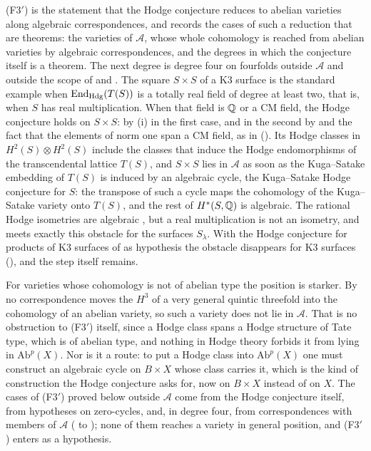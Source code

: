 \begin{remark}\label{rem:f3primeopen}
\textup{(F3$'$)} is the statement that the Hodge conjecture reduces to
abelian varieties along algebraic correspondences, and
 records the cases of such a reduction that are theorems:
the varieties of $\mathcal{A}$, whose whole cohomology is reached from abelian
varieties by algebraic correspondences, and the degrees in which the
conjecture itself is a theorem. The next degree is degree four on fourfolds
outside $\mathcal{A}$ and outside the scope of  and
. The square $S\times S$ of a K3 surface is the standard
example when $\operatorname{End}_{\mathrm{Hdg}}(T(S))$ is a totally real field of degree
at least two, that is, when $S$ has real multiplication. When that field is
$\mathbb{Q}$ or a CM field, the Hodge conjecture holds on $S\times S$: by
(i) in the first case, and in the second by
\cite{Bus19} and the fact that the elements of norm one span a CM field, as in
\cite{RM08} (). Its Hodge classes in
$H^{2}(S)\otimes H^{2}(S)$ include the classes
that induce the Hodge endomorphisms of the transcendental lattice $T(S)$, and
$S\times S$ lies in $\mathcal{A}$ as soon as the Kuga--Satake embedding of
$T(S)$ is induced by an algebraic cycle, the Kuga--Satake Hodge conjecture for
$S$: the transpose of such a cycle maps the
cohomology of the Kuga--Satake variety onto $T(S)$, and the rest of
$H^{*}(S,\mathbb{Q})$ is algebraic. The rational Hodge isometries are algebraic
\cite{Bus19}, but a real multiplication is not an isometry, and
 meets exactly this obstacle for the surfaces
$S_{\lambda}$. With the Hodge conjecture for products of K3 surfaces of
\cite{OAI26f} as hypothesis the obstacle disappears for K3 surfaces
(), and the step itself remains.

For varieties whose cohomology is not of abelian type the position is
starker. By  no correspondence moves the $H^{3}$ of a
very general quintic threefold into the cohomology of an abelian variety, so
such a variety does not lie in $\mathcal{A}$. That is no obstruction to
\textup{(F3$'$)} itself, since a Hodge class spans a Hodge structure of Tate
type, which is of abelian type, and nothing in Hodge theory forbids it from
lying in $\mathrm{Ab}^{p}(X)$. Nor is it a route: to put a Hodge class into
$\mathrm{Ab}^{p}(X)$ one must construct an algebraic cycle on $B\times X$
whose class carries it, which is the kind of construction the Hodge
conjecture asks for, now on $B\times X$ instead of on $X$. The cases of
\textup{(F3$'$)} proved below outside $\mathcal{A}$ come from the Hodge
conjecture itself, from hypotheses on zero-cycles, and, in degree four, from
correspondences with members of $\mathcal{A}$
( to ); none of them reaches a
variety in general position, and \textup{(F3$'$)} enters  as
a hypothesis.
\end{remark}

